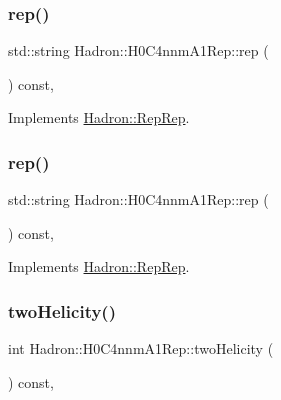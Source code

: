 \subsubsection{\texorpdfstring{rep()}{rep()}\hspace{0.1cm}{\footnotesize\ttfamily [4/5]}}
{\footnotesize\ttfamily std\+::string Hadron\+::\+H0\+C4nnm\+A1\+Rep\+::rep (\begin{DoxyParamCaption}{ }\end{DoxyParamCaption}) const\hspace{0.3cm}{\ttfamily [inline]}, {\ttfamily [virtual]}}



Implements \mbox{\hyperlink{structHadron_1_1RepRep_ab3213025f6de249f7095892109575fde}{Hadron\+::\+Rep\+Rep}}.

\mbox{\label{structHadron_1_1H0C4nnmA1Rep_a99c77d4cddc66d00c5fbeb5e4927dfba}} 
\subsubsection{\texorpdfstring{rep()}{rep()}\hspace{0.1cm}{\footnotesize\ttfamily [5/5]}}
{\footnotesize\ttfamily std\+::string Hadron\+::\+H0\+C4nnm\+A1\+Rep\+::rep (\begin{DoxyParamCaption}{ }\end{DoxyParamCaption}) const\hspace{0.3cm}{\ttfamily [inline]}, {\ttfamily [virtual]}}



Implements \mbox{\hyperlink{structHadron_1_1RepRep_ab3213025f6de249f7095892109575fde}{Hadron\+::\+Rep\+Rep}}.

\mbox{\label{structHadron_1_1H0C4nnmA1Rep_a53bf7b92886bd139cfbc1cb86f44aa28}} 
\subsubsection{\texorpdfstring{twoHelicity()}{twoHelicity()}\hspace{0.1cm}{\footnotesize\ttfamily [1/3]}}
{\footnotesize\ttfamily int Hadron\+::\+H0\+C4nnm\+A1\+Rep\+::two\+Helicity (\begin{DoxyParamCaption}{ }\end{DoxyParamCaption}) const\hspace{0.3cm}{\ttfamily [inline]}, {\ttfamily [virtual]}}

